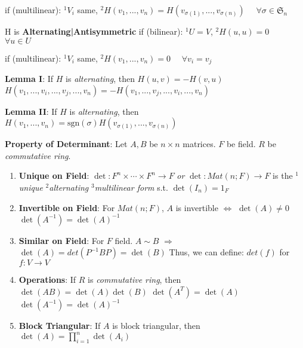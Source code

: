 \documentclass[9pt]{article}
\begin{document}
\hspace{78pt} if (multilinear): $^1V_i$ same, \quad $^2H(v_1,...,v_n)=H(v_{\sigma(1)},...,v_{\sigma(n)})$ \ \ $\forall \sigma\in\mathfrak{S}_n$

\quad H is \textbf{Alternating|Antisymmetric} if (bilinear): $^1U=V$, \quad $^2H(u,u)=0$ \ \ $\forall u\in U$

\hspace{153pt} if (multilinear): $^1V_i$ same, \quad $^2H(v_1,...,v_n)=0$ \ \ $\forall v_i=v_j$ 

\quad \textbf{Lemma I}: If $H$ is \textit{alternating}, then \quad $H(u,v)=-H(v,u)$ \qquad $H(v_1,...,v_i,...,v_j,...,v_n)=-H(v_1,...,v_j,...,v_i,...,v_n)$ 

\quad \textbf{Lemma II}: If $H$ is \textit{alternating}, then \quad $H(v_1,...,v_n)=\text{sgn}(\sigma)H(v_{\sigma(1)},...,v_{\sigma(n)})$ 

\textbf{Property of Determinant}: Let $A,B$ be $n\times n$ matrices. \quad $F$ be field. \quad $R$ be \textit{commutative ring}.
\begin{enumerate}[itemsep=-2pt, topsep=-2pt]
    \item \textbf{Unique on Field}: $\det:F^n\times \cdots\times F^n\to F$ \textit{or} $\det: Mat(n;F) \to F$ is the $^1$\textit{unique} $^2$\textit{alternating} $^3$\textit{multilinear form} s.t. $\det(I_n)=1_F$
    \item \textbf{Invertible on Field}: For $Mat(n;F)$, $A$ is invertible $\Leftrightarrow$ $\det(A)\ne0$ \quad $\det(A^{-1})=\det(A)^{-1}$ 
    \item \textbf{Similar on Field}: For $F$ field. \quad $A\sim B$ $\Rightarrow$ $\det(A)=det(P^{-1}BP)=\det(B)$ \qquad Thus, we can define: $det(f)$ for $f:V\to V$
    \item \textbf{Operations}: {\scriptsize If $R$ is \textit{commutative ring}}, then $\det(AB)=\det(A)\det(B)$ \quad $\det(A^T)=\det(A)$  \quad $\det(A^{-1})=\det(A)^{-1}$
    \item \textbf{Block Triangular}: If $A$ is block triangular, then $\det(A)=\prod_{i=1}^n\det(A_i)$ 
\end{enumerate}
\end{document}
